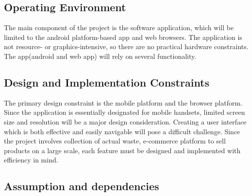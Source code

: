 \documentclass{article}
\begin{document}
\subsection{Operating Environment}
\par The main component of the project is the software application, which will be limited to the android platform-based app and web browsers. The application is not 
resource- or graphics-intensive, so there are no practical hardware constraints. The app(android and web app) will rely on  several  functionality. 
 
\subsection{Design and Implementation Constraints}
\par The primary design constraint is the mobile platform and the browser platform. Since the application is essentially designated for mobile  handsets, limited screen size and resolution will be a major design consideration. Creating a user interface  which is both effective and easily navigable will pose a difficult challenge. Since the project involves collection of actual waste, e-commerce platform to sell products on a large scale, each feature must be designed and implemented with efficiency in mind. 
\subsection{Assumption and dependencies}
\par
\end{document}
